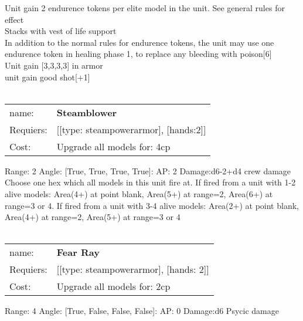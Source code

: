 Unit gain 2 endurence tokens per elite model in the unit. See general rules for effect\\ 
Stacks with vest of life support\\ 
In addition to the normal rules for endurence tokens, the unit may use one endurence token in healing phase 1, to replace any bleeding with poison[6]\\ 
Unit gain [3,3,3,3] in armor\\ 
unit gain good shot[+1]\\ 









\ \\
\begin{tabular}{ll}
name: & {\bf Steamblower } \\
Requiers: & [[type: steampowerarmor], [hands:2]] \\
Cost: & Upgrade all models for: 4cp \\
\end{tabular}



Range: 2  Angle: [True, True, True, True]: AP: 2 Damage:d6-2+d4 crew damage \\
Choose one hex which all models in this unit fire at. If fired from a unit with 1-2 alive models: Area(4+) at point blank, Area(5+) at range=2, Area(6+) at range=3 or 4. If fired from a unit with 3-4 alive models: Area(2+) at point blank, Area(4+) at range=2, Area(5+) at range=3 or 4\\ 








\ \\
\begin{tabular}{ll}
name: & {\bf Fear Ray } \\
Requiers: & [[type: steampowerarmor], [hands: 2]] \\
Cost: & Upgrade all models for: 2cp \\
\end{tabular}



Range: 4  Angle: [True, False, False, False]: AP: 0 Damage:d6 Psycic damage \\








